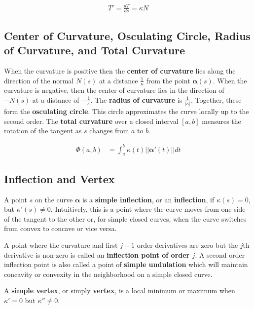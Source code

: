 \documentclass[11pt]{article}
\begin{document}
\begin{align*}
    T' = \frac{dT}{ds} = \kappa N
\end{align*}

\subsection{Center of Curvature, Osculating Circle, Radius of Curvature, and Total Curvature}
\label{sec:org147c4fe}
When the curvature is positive then the \textbf{center of curvature} lies along the direction of the normal \(N\left( s \right)\) at a distance \(\frac{1}{\kappa}\) from the point \(\boldsymbol{\alpha}\left( s \right)\). When the curvature is negative, then the center of curvature lies in the direction of \(-N\left( s \right)\) at a distance of \(-\frac{1}{\kappa}\). The \textbf{radius of curvature} is \(\frac{1}{\lvert \kappa \lvert}\). Together, these form the \textbf{osculating circle}. This circle approximates the curve locally up to the second order. The \textbf{total curvature} over a closed interval \(\left[a,b\right]\) measures the rotation of the tangent as \(s\) changes from \(a\) to \(b\).

\begin{align*}
    \Phi\left(a,b\right) &= \int_{a}^{b}\kappa\left(t\right)\lvert\lvert\boldsymbol{\alpha}'\left(t\right)\rvert\rvert dt
\end{align*}

\subsection{Inflection and Vertex}
\label{sec:orgc00ce67}
A point \(s\) on the curve \(\boldsymbol{\alpha}\) is a \textbf{simple inflection}, or an \textbf{inflection}, if \(\kappa\left( s \right) = 0\), but \(\kappa'\left( s \right) \neq 0\). Intuitively, this is a point where the curve moves from one side of the tangent to the other or, for simple closed curves, when the curve switches from convex to concave or vice versa.

A point where the curvature and first \(j-1\) order derivatives are zero but the \(j\text{th}\) derivative is non-zero is called an \textbf{inflection point of order \(j\)}. A second order inflection point is also called a point of \textbf{simple undulation} which will maintain concavity or convexity in the neighborhood on a simple closed curve.

A \textbf{simple vertex}, or simply \textbf{vertex}, is a local minimum or maximum when \(\kappa' = 0\) but \(\kappa'' \neq 0\).
\end{document}
